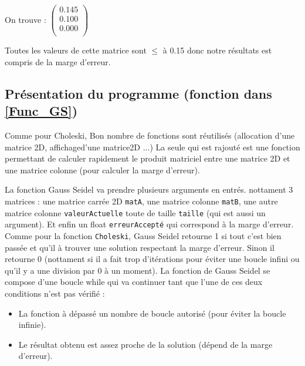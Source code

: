 \documentclass[12pt]{article}
\begin{document}
\vspace{0.1cm}

On trouve : $\begin{pmatrix}
 
    0.145 \\

    0.100 \\

    0.000 \\

  \end{pmatrix}
  $

  \vspace{0.1cm}
  Toutes les valeurs de cette matrice sont $\leq$ à 0.15 donc notre résultats est compris de la marge d'erreur. 

\subsection{Présentation du programme (fonction dans \ref{Func_GS})}

\begin{multicols}{2}
Comme pour Choleski, Bon nombre de fonctions sont réutilisés (allocation d'une matrice 2D, affichaged'une matrice2D ...) La seule qui est rajouté est une fonction permettant de calculer rapidement le produit matriciel entre une matrice 2D et une matrice colonne (pour calculer la marge d'erreur).


La fonction Gauss Seidel va prendre plusieurs arguments en entrés. nottament 3 matrices : une matrice carrée 2D \texttt{matA}, une matrice colonne \texttt{matB}, une autre matrice colonne \texttt{valeurActuelle} toute de taille \texttt{taille} (qui est aussi un argument). Et enfin un float \texttt{erreurAccepté} qui correspond à la marge d'erreur.
Comme pour la fonction \texttt{Choleski}, Gauss Seidel retourne 1 si tout c'est bien passée et qu'il à trouver une solution respectant la marge d'erreur. Sinon il retourne 0 (nottament si il a fait trop d'itérations pour éviter une boucle infini ou qu'il y a une division par 0 à un moment).
La fonction de Gauss Seidel se compose d'une boucle while qui va continuer tant que l’une de ces deux conditions n’est pas vérifié :
\end{multicols}

\begin{itemize}
\item La fonction à dépassé un nombre de boucle autorisé (pour éviter la boucle infinie).
\item Le résultat obtenu est assez proche de la solution (dépend de la marge d'erreur).
\end{itemize}
\end{document}
